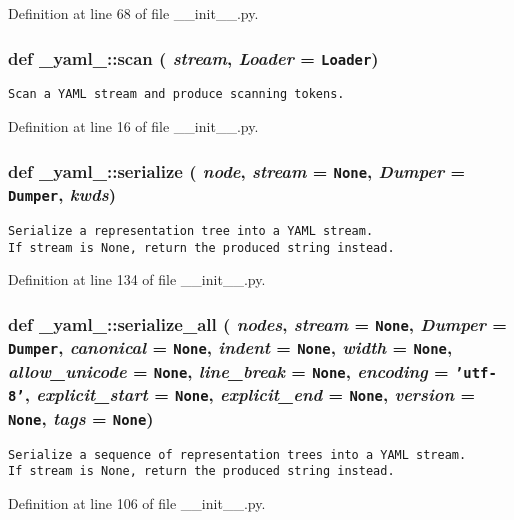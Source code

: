 Definition at line 68 of file \_\-\_\-init\_\-\_\-.py.
\subsubsection{\setlength{\rightskip}{0pt plus 5cm}def \_\-yaml\_\-::scan ( {\em stream},  {\em Loader} = {\tt Loader})}\label{namespace__yaml___53c97e8db9a9cbf49b8113abd0e83758}




\footnotesize\begin{verbatim}
Scan a YAML stream and produce scanning tokens.
\end{verbatim}
\normalsize
 

Definition at line 16 of file \_\-\_\-init\_\-\_\-.py.
\subsubsection{\setlength{\rightskip}{0pt plus 5cm}def \_\-yaml\_\-::serialize ( {\em node},  {\em stream} = {\tt None},  {\em Dumper} = {\tt Dumper},  {\em kwds})}\label{namespace__yaml___bc9d9c4b537c5407197add90377c78da}




\footnotesize\begin{verbatim}
Serialize a representation tree into a YAML stream.
If stream is None, return the produced string instead.
\end{verbatim}
\normalsize
 

Definition at line 134 of file \_\-\_\-init\_\-\_\-.py.
\subsubsection{\setlength{\rightskip}{0pt plus 5cm}def \_\-yaml\_\-::serialize\_\-all ( {\em nodes},  {\em stream} = {\tt None},  {\em Dumper} = {\tt Dumper},  {\em canonical} = {\tt None},  {\em indent} = {\tt None},  {\em width} = {\tt None},  {\em allow\_\-unicode} = {\tt None},  {\em line\_\-break} = {\tt None},  {\em encoding} = {\tt 'utf-8'},  {\em explicit\_\-start} = {\tt None},  {\em explicit\_\-end} = {\tt None},  {\em version} = {\tt None},  {\em tags} = {\tt None})}\label{namespace__yaml___5b3046dc8ac87ec7e4aa1b6769904108}




\footnotesize\begin{verbatim}
Serialize a sequence of representation trees into a YAML stream.
If stream is None, return the produced string instead.
\end{verbatim}
\normalsize
 

Definition at line 106 of file \_\-\_\-init\_\-\_\-.py.